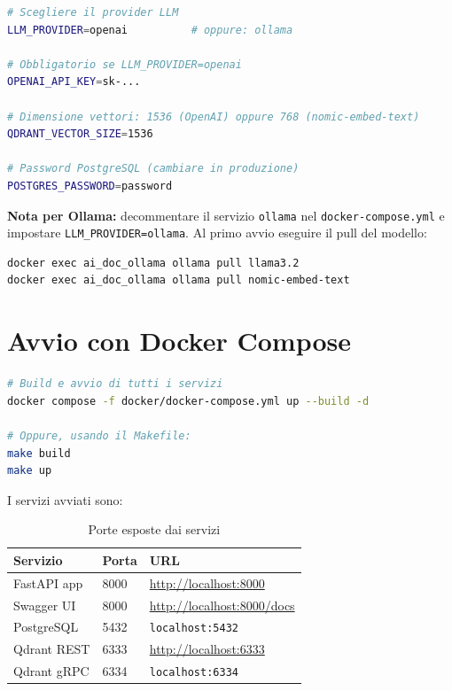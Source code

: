 \begin{lstlisting}[language=bash]
# Scegliere il provider LLM
LLM_PROVIDER=openai          # oppure: ollama

# Obbligatorio se LLM_PROVIDER=openai
OPENAI_API_KEY=sk-...

# Dimensione vettori: 1536 (OpenAI) oppure 768 (nomic-embed-text)
QDRANT_VECTOR_SIZE=1536

# Password PostgreSQL (cambiare in produzione)
POSTGRES_PASSWORD=password
\end{lstlisting}

\textbf{Nota per Ollama:} decommentare il servizio \texttt{ollama} nel
\texttt{docker-compose.yml} e impostare \texttt{LLM\_PROVIDER=ollama}.
Al primo avvio eseguire il pull del modello:
\begin{lstlisting}[language=bash]
docker exec ai_doc_ollama ollama pull llama3.2
docker exec ai_doc_ollama ollama pull nomic-embed-text
\end{lstlisting}

\section{Avvio con Docker Compose}

\begin{lstlisting}[language=bash]
# Build e avvio di tutti i servizi
docker compose -f docker/docker-compose.yml up --build -d

# Oppure, usando il Makefile:
make build
make up
\end{lstlisting}

I servizi avviati sono:

\begin{table}[H]
  \centering
  \begin{tabularx}{\textwidth}{llX}
    \toprule
    \textbf{Servizio} & \textbf{Porta} & \textbf{URL} \\
    \midrule
    FastAPI app & 8000 & \url{http://localhost:8000} \\
    Swagger UI  & 8000 & \url{http://localhost:8000/docs} \\
    PostgreSQL  & 5432 & \texttt{localhost:5432} \\
    Qdrant REST & 6333 & \url{http://localhost:6333} \\
    Qdrant gRPC & 6334 & \texttt{localhost:6334} \\
    \bottomrule
  \end{tabularx}
  \caption{Porte esposte dai servizi}
\end{table}

